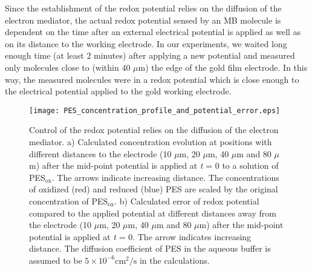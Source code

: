 \documentclass[11pt,a4paper,onecolumn]{article}
\begin{document}
Since the establishment of the redox potential relies on the diffusion of the electron mediator, the actual redox potential sensed by an MB molecule is dependent on the time after an external electrical potential is applied as well as on its distance to the working electrode. In our experiments, we waited long enough time (at least 2 minutes) after applying a new potential and measured only molecules close to (within 40 $\mu$m) the edge of the gold film electrode. In this way, the measured molecules were in a redox potential which is close enough to the electrical potential applied to the gold working electrode.
\begin{figure}
  \centering
  \texttt{[image: PES\_concentration\_profile\_and\_potential\_error.eps]}
	\makeatletter
	\renewcommand{\fnum@figure}{\figurename~S\thefigure}
	\makeatother
  \caption{Control of the redox potential relies on the diffusion of the electron mediator. a) Calculated concentration evolution at positions with different distances to the electrode (10 $\mu$m, 20 $\mu$m, 40 $\mu$m and 80 $\mu$m) after the mid-point potential is applied at \textit{t} = 0 to a solution of PES$_\mathrm{ox}$. The arrows indicate increasing distance. The concentrations of oxidized (red) and reduced (blue) PES are scaled by the original concentration of PES$_\mathrm{ox}$. b) Calculated error of redox potential compared to the applied potential at different distances away from the electrode (10 $\mu$m, 20 $\mu$m, 40 $\mu$m and 80 $\mu$m) after the mid-point potential is applied at \textit{t} = 0. The arrow indicates increasing distance. The diffusion coefficient of PES in the aqueous buffer is assumed to be $5\times10^{-6} \mathrm{cm}^{2}/\mathrm{s}$ in the calculations.
	}
  \label{fg:pes_principle}
\end{figure}
\end{document}
